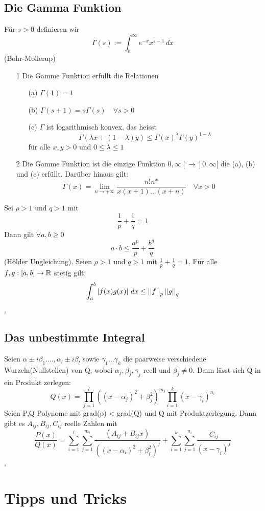 \subsection{Die Gamma Funktion}
\Def[5.59] Für \(s > 0\) definieren wir
\[ \Gamma(s) := \int_{0}^{\infty} e^{-x}x^{s-1} \,dx\]
\Satz[5.60](Bohr-Mollerup)
\begin{enumerate}
    \item [1] Die Gamme Funktion erfüllt die Relationen
    \begin{enumerate}
        \item [(a)] \( \Gamma(1) = 1\)
        \item [(b)] \(\Gamma(s+1) = s\Gamma(s) \quad \forall s > 0 \)
        \item [(c)] \( \Gamma\) ist logarithmisch konvex, das heisst
        \[\Gamma( \lambda x + (1 - \lambda)y) \leq \Gamma(x)^{\lambda}\Gamma(y)^{1-\lambda}\]
        für alle \(x,y > 0\) und \(0 \leq \lambda \leq 1\)
    \end{enumerate}
    \item [2] Die Gamme Funktion ist die einzige Funktion \( 0, \infty[ \rightarrow ]0, \infty [\) die (a), (b) und (c) erfüllt. Darüber hinaus gilt:
    \[\Gamma(x) = \lim\limits_{n \rightarrow +\infty} \frac{n!n^x}{x(x+1) \dots (x+n)} \quad \forall x > 0\] 
\end{enumerate}
\Lemma[5.61] Sei \( \rho > 1\) und \(q > 1\) mit
\[ \frac{1}{p} + \frac{1}{q} = 1\]
Dann gilt \(\forall a,b \geq 0 \)
\[ a \cdot b \leq \frac{a^p}{p} + \frac{b^q}{q}\]
\Satz[5.62](Hölder Ungleichung). Seien \( \rho > 1\) und \( q > 1\) mit \( \frac{1}{p} + \frac{1}{q} = 1\). Für alle \(f,g : [a,b] \rightarrow \mathbb{R} \) stetig gilt:
\[ \int_{a}^{b} \left\lvert f(x)g(x) \right\rvert \,dx \leq \left\lvert \left\lvert f \right\rvert \right\rvert_p \left\lvert \left\lvert g \right\rvert \right\rvert_q\]
\sep
\subsection{Das unbestimmte Integral}
\Def[Produktzerlegung]
Seien \( \alpha \pm i\beta_1. \dots , \alpha_l \pm i\beta_l\) sowie \( \gamma_1 \dots \gamma_k \) die paarweise verschiedene Wurzeln(Nullstellen) von Q,
wobei \( \alpha_j, \beta_j, \gamma_j\) reell und \(\beta_j \neq 0\). Dann lässt sich Q in ein Produkt zerlegen:
\[ Q(x) = \prod_{j=1}^l ((x- \alpha_j)^2 + \beta_j^2)^{m_j} \prod_{i=1}^k (x - \gamma_i)^{n_i}\]
\Satz[5.65] Seien P,Q Polynome mit grad(p) < grad(Q) und Q mit Produktzerlegung. Dann gibt es \( A_{ij}, B_{ij}, C_{ij}\) reelle Zahlen mit
\[ \frac{P(x)}{Q(x)} = \sum_{i=1}^l \sum_{j=1}^{m_i} \frac{(A_{ij} + B_{ij}x)}{((x - \alpha_i)^2 + \beta_i^2)^j} + \sum_{i=1}^k \sum_{j=1}^{n_i} \frac{C_{ij}}{(x - \gamma_i)^j}\]
\sep
\section{Tipps und Tricks}